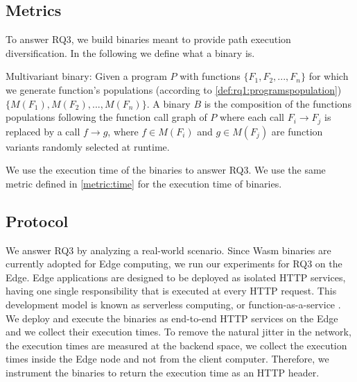 
\subsection*{Metrics}

To answer RQ3, we build \wasm binaries meant to provide path execution diversification. In the following we define what a binary is. 

\begin{definition}{Multivariant binary:}
    \label{def:multivariant_binary}
    \normalfont
    Given a program $P$ with functions $\{F_1, F_2, ..., F_n\}$ for which we generate function's populations (according to \autoref{def:rq1:programspopulation}) $\{M(F_1), M(F_2), ..., M(F_n)\}$. A binary $B$ is the composition of the functions populations following the function call graph of $P$ where each call $F_i \rightarrow F_j$ is replaced by a call $f \rightarrow g $, where $f\in M(F_i)$ and $g \in M(F_j)$ are function variants randomly selected at runtime. 

\end{definition}

We use the execution time of the binaries to answer RQ3. We use the same metric defined in \autoref{metric:time} for the execution time of binaries.

\subsection*{Protocol}

We answer RQ3 by analyzing a real-world scenario. Since Wasm binaries are currently adopted for Edge computing,
we run our experiments for RQ3 on the Edge. 
Edge applications are designed to be deployed as isolated HTTP services, having one single responsibility that is executed at every HTTP request. This development model is known as serverless computing, or function-as-a-service \cite{shillaker2020faasm,Narayan2021Swivel}. 
We deploy and execute the binaries as end-to-end HTTP services on the Edge and we collect their execution times.
To remove the natural jitter in the network, the execution times are measured at the backend space, \ie we collect the execution times inside the Edge node and not from the client computer. 
Therefore, we instrument the binaries to return the execution time as an HTTP header. 

